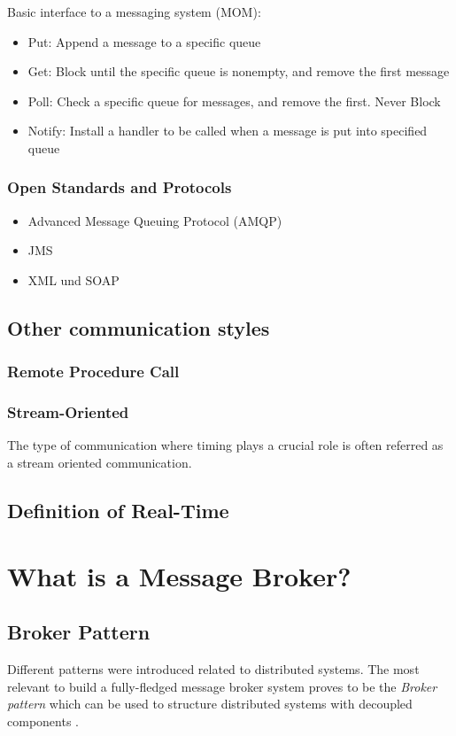 Basic interface to a messaging system (MOM): \cite{TAN06}
\begin{itemize}
	\item Put: Append a message to a specific queue 
	\item Get: Block until the specific queue is nonempty, and remove the
first message 
	\item Poll: Check a specific queue for messages, and remove the first.
Never Block 
	\item Notify: Install a handler to be called when a message is put into
specified queue
\end{itemize}

\subsubsection{Open Standards and Protocols} 
\begin{itemize} 
	\item Advanced Message Queuing Protocol (AMQP) 
	\item JMS	
	\item XML und SOAP
\end{itemize}

\subsection{Other communication styles} \subsubsection{Remote Procedure Call}

\subsubsection{Stream-Oriented}
The type of communication where timing plays a crucial role is often referred as a
stream oriented communication. 


\subsection{Definition of Real-Time}

\section{What is a Message Broker?}

\subsection{Broker Pattern} 
Different patterns were introduced related to distributed systems. The most
relevant to build a fully-fledged message broker system proves to be the
\textit{Broker pattern} which can be used to structure distributed systems with
decoupled components \cite{POSA1}. 

